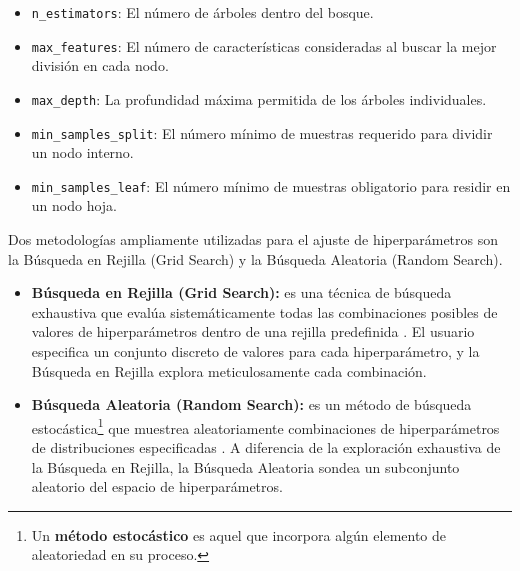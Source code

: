 \begin{itemize}
    \item \texttt{n\_estimators}: El número de árboles dentro del bosque.
    \item \texttt{max\_features}: El número de características consideradas al buscar la mejor división en cada nodo.
    \item \texttt{max\_depth}: La profundidad máxima permitida de los árboles individuales.
    \item \texttt{min\_samples\_split}: El número mínimo de muestras requerido para dividir un nodo interno.
    \item \texttt{min\_samples\_leaf}: El número mínimo de muestras obligatorio para residir en un nodo hoja.
\end{itemize}

Dos metodologías ampliamente utilizadas para el ajuste de hiperparámetros son la Búsqueda en Rejilla (Grid Search) y la Búsqueda Aleatoria (Random Search).

\begin{itemize}
	\item \textbf{Búsqueda en Rejilla (Grid Search):} es una técnica de búsqueda exhaustiva que evalúa sistemáticamente todas las combinaciones posibles de valores de hiperparámetros dentro de una rejilla predefinida \cite{bergstra2012random}.
	El usuario especifica un conjunto discreto de valores para cada hiperparámetro, y la Búsqueda en Rejilla explora meticulosamente cada combinación.

	\item \textbf{Búsqueda Aleatoria (Random Search):} es un método de búsqueda estocástica\footnote{Un \textbf{método estocástico} es aquel que incorpora algún elemento de aleatoriedad en su proceso.} que muestrea aleatoriamente combinaciones de hiperparámetros de distribuciones especificadas \cite{bergstra2012random}.
	A diferencia de la exploración exhaustiva de la Búsqueda en Rejilla, la Búsqueda Aleatoria sondea un subconjunto aleatorio del espacio de hiperparámetros.
\end{itemize}
